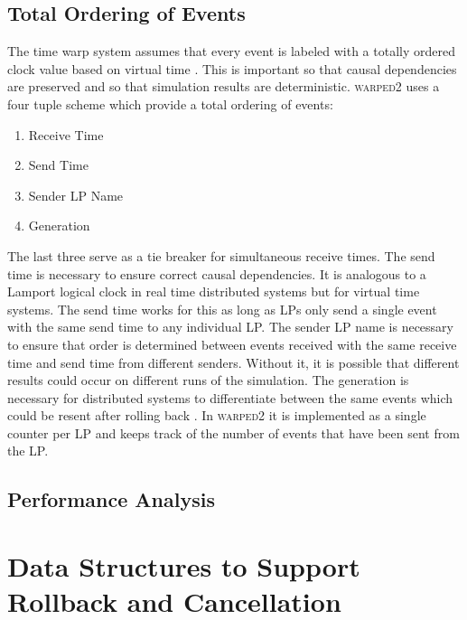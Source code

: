 \documentclass[11pt]{book}
\newcommand{\showPlots}[3]{
  \begin{figure}
    \begin{minipage}{.5\textwidth}
      \begin{center}
        \texttt{[image: figs/traffic/\#1]} \\
        Traffic Model \\
      \end{center}
    \end{minipage} \hfill
    \begin{minipage}{.5\textwidth}
      \begin{center}
        \texttt{[image: figs/pcs/\#1]} \\
        PCS Model \\
      \end{center}
    \end{minipage}
    \begin{minipage}{.5\textwidth}
      \begin{center}
        \texttt{[image: figs/epidemic/\#1]} \\
        Epidemic Model \\
      \end{center}
    \end{minipage} \hfill
    \begin{minipage}{.5\textwidth}
      \begin{center}
        \texttt{[image: figs/airport/\#1]} \\
        Airport Model \\
      \end{center}
    \end{minipage}
    \caption{#3}\label{#2}
  \end{figure}
}
\begin{document}
\subsection{Total Ordering of Events}

The time warp system assumes that every event is labeled with a totally ordered clock value
based on virtual time \cite{jefferson-85}. This is important so that causal dependencies
are preserved and so that simulation results are deterministic\cite{ronngren-99}.
\textsc{warped2} uses a four tuple scheme which provide a total ordering of events:

\begin{enumerate}
    \item Receive Time
    \item Send Time
    \item Sender LP Name
    \item Generation
\end{enumerate}

\noindent
The last three serve as a tie breaker for simultaneous receive times. The send time is
necessary to ensure correct causal dependencies. It is analogous to a Lamport logical
clock\cite{lamport-78} in real time distributed systems but for virtual time systems. The
send time works for this as long as LPs only send a single event with the same send time
to any individual LP. The sender LP name is necessary to ensure that order is determined
between events received with the same receive time and send time from different senders.
Without it, it is possible that different results could occur on different runs of the
simulation\cite{ronngren-99}. The generation is necessary for distributed systems to
differentiate between the same events which could be resent after rolling back
\cite{ronngren-99}. In \textsc{warped2} it is implemented as a single counter per LP and
keeps track of the number of events that have been sent from the LP.

\subsection{Performance Analysis}


\section{Data Structures to Support Rollback and Cancellation}
\end{document}
